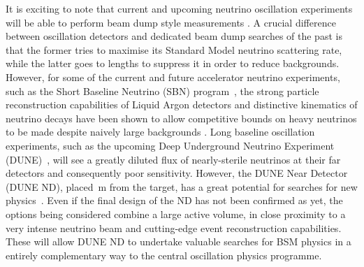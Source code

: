 It is exciting to note that current and upcoming neutrino oscillation
experiments will be able to perform beam dump style measurements \cite{Kusenko:2004qc, Asaka:2012bb, Abe:2019kgx}. 
%
A crucial difference between oscillation detectors and dedicated beam dump searches of the past is that %
the former tries to maximise its Standard Model neutrino scattering rate, while the latter goes to lengths %
to suppress it in order to reduce backgrounds.
%
However, for some of the current and future accelerator neutrino experiments, %
such as the Short Baseline Neutrino (SBN) program~\cite{Antonello:2015lea}, %
the strong particle reconstruction capabilities of Liquid Argon detectors and distinctive kinematics %
of neutrino decays have been shown to allow competitive bounds on heavy neutrinos %
to be made despite naively large backgrounds \cite{Ballett:2016opr}. 
%
Long baseline oscillation experiments, such as the upcoming Deep Underground Neutrino Experiment (DUNE)~\cite{Abi:2018dnh}, %
will see a greatly diluted flux of nearly-sterile neutrinos at their far detectors and consequently poor sensitivity.
However, the DUNE Near Detector (DUNE ND), placed \,m from the target, has a great potential %
for searches for new physics~\cite{Adams:2013qkq}.
Even if the final design of the ND has not been confirmed as yet, the options being considered combine a large active volume, %
in close proximity to a very intense neutrino beam and cutting-edge event reconstruction capabilities.
These will allow DUNE ND to undertake valuable searches for BSM physics in a entirely complementary way %
to the central oscillation physics programme. 



